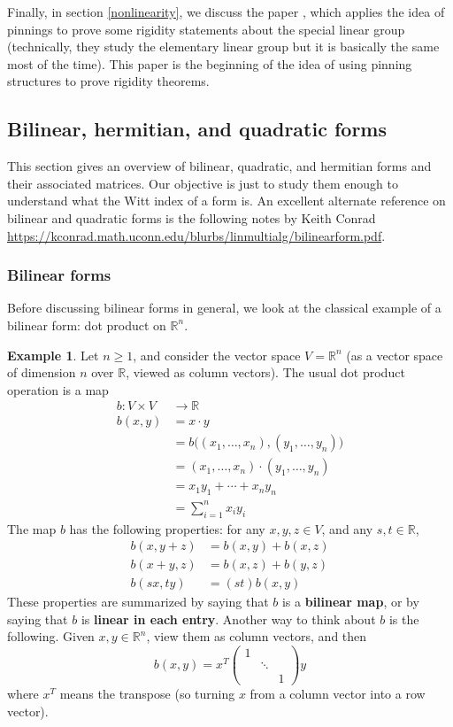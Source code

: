 \documentclass[12pt]{article}
\theoremstyle{definition}
\newtheorem{example}[theorem]{Example}
\numberwithin{theorem}{subsection}
\newcommand{\R}{\mathbb{R}}
\newcommand{\tbf}{\textbf}
\begin{document}
Finally, in section \ref{nonlinearity}, we discuss the paper \cite{Kassabov-Sapir}, which applies the idea of pinnings to prove some rigidity statements about the special linear group (technically, they study the elementary linear group but it is basically the same most of the time). This paper is the beginning of the idea of using pinning structures to prove rigidity theorems.

\subsection{Bilinear, hermitian, and quadratic forms}
\label{forms}

This section gives an overview of bilinear, quadratic, and hermitian forms and their associated matrices. Our objective is just to study them enough to understand what the Witt index of a form is. An excellent alternate reference on bilinear and quadratic forms is the following notes by Keith Conrad \url{https://kconrad.math.uconn.edu/blurbs/linmultialg/bilinearform.pdf}.

\subsubsection{Bilinear forms}

Before discussing bilinear forms in general, we look at the classical example of a bilinear form: dot product on $\R^n$.

\begin{example}
Let $n \ge 1$, and consider the vector space $V = \R^n$ (as a vector space of dimension $n$ over $\R$, viewed as column vectors). The usual dot product operation is a map
\begin{align*}
	b: V \times V &\to \R \\
	 b(x, y) &= x \cdot y \\
	&= b \Big( (x_1, \ldots, x_n) , (y_1, \ldots, y_n) \Big) \\
	&= (x_1, \ldots, x_n) \cdot (y_1, \ldots, y_n)   \\
	&= x_1 y_1 + \cdots + x_n y_n \\
	&= \sum_{i=1}^n x_i y_i
\end{align*}
The map $b$ has the following properties: for any $x, y, z \in V$, and any $s, t \in \R$,
\begin{align*}
	b( x,  y +  z) &= b(  x,  y) + b( x,  z) \\
	b( x +  y,  z) &= b( x,  z) + b( y,  z) \\
	b(s  x, t  y) &= (st) b( x,  y)
\end{align*}
These properties are summarized by saying that $b$ is a \tbf{bilinear map}, or by saying that $b$ is \tbf{linear in each entry}. Another way to think about $b$ is the following. Given $ x,  y \in \R^n$, view them as column vectors, and then 
\[
	b( x,  y) =  x^T
	\begin{pmatrix}
		1 \\
		& \ddots \\
		&& 1
	\end{pmatrix}
	  y
\]
where $ x^T$ means the transpose (so turning $ x$ from a column vector into a row vector).
\end{example}
\end{document}
